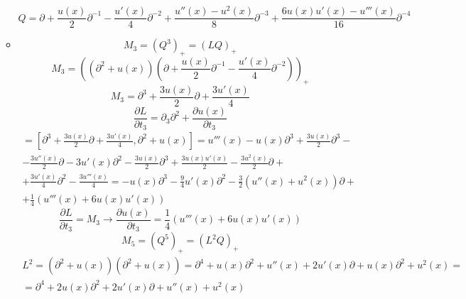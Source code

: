 \documentclass[12pt]{article}
\theoremstyle{definition}
\begin{document}
\begin{enumerate}
\begin{itemize}
\begin{equation}
            \boxed{Q=\partial+\frac{u(x)}{2}\partial^{-1}-\frac{u'(x)}{4}\partial^{-2}+\frac{u''(x)-u^2(x)}{8}\partial^{-3}+\frac{6u(x)u'(x)-u'''(x)}{16}\partial^{-4}}
        \end{equation}
        \item 
        \begin{equation}
            M_3 = (Q^3)_+=(LQ)_+
        \end{equation}
        \begin{equation}
            M_3=\left((\partial^2+u(x))\left(\partial+\frac{u(x)}{2}\partial^{-1}-\frac{u'(x)}{4}\partial^{-2}\right)\right)_+
        \end{equation}
        \begin{equation}
            \boxed{M_3=\partial^3+\frac{3u(x)}{2}\partial+\frac{3u'(x)}{4}}
        \end{equation}
        \begin{equation}
            \frac{\partial L}{\partial t_3}=\partial_3\partial^2+\frac{\partial u(x)}{\partial t_3}
        \end{equation}
        \begin{multline}
            [M_3,L]=\left[\partial^3+\frac{3u(x)}{2}\partial+\frac{3u'(x)}{4},\partial^2+u(x)\right]=u'''(x)-u(x)\partial^3+\frac{3u(x)}{2}\partial^3-\\-\frac{3u''(x)}{2}\partial-3u'(x)\partial^2-\frac{3u(x)}{2}\partial^3+\frac{3u(x)u'(x)}{2}-\frac{3u^2(x)}{2}\partial+\\+\frac{3u'(x)}{4}\partial^2-\frac{3u'''(x)}{4}=-u(x)\partial^3-\frac{9}{4}u'(x)\partial^2-\frac{3}{2}(u''(x)+u^2(x))\partial+\\+\frac{1}{4}(u'''(x)+6u(x)u'(x))
        \end{multline}
        \begin{equation}
            \frac{\partial L}{\partial t_3}=M_3\rightarrow\boxed{\frac{\partial u(x)}{\partial t_3}=\frac{1}{4}(u'''(x)+6u(x)u'(x))}
        \end{equation}
        \begin{equation}
            M_5 = (Q^5)_+=(L^2Q)_+
        \end{equation}
        \begin{multline}
            L^2=(\partial^2+u(x))(\partial^2+u(x))=\partial^4+u(x)\partial^2+u''(x)+2u'(x)\partial+u(x)\partial^2+u^2(x)=\\=\partial^4+2u(x)\partial^2+2u'(x)\partial+u''(x)+u^2(x)
        \end{multline}
        \begin{multline}

\end{multline}
\end{itemize}
\end{enumerate}
\end{document}
